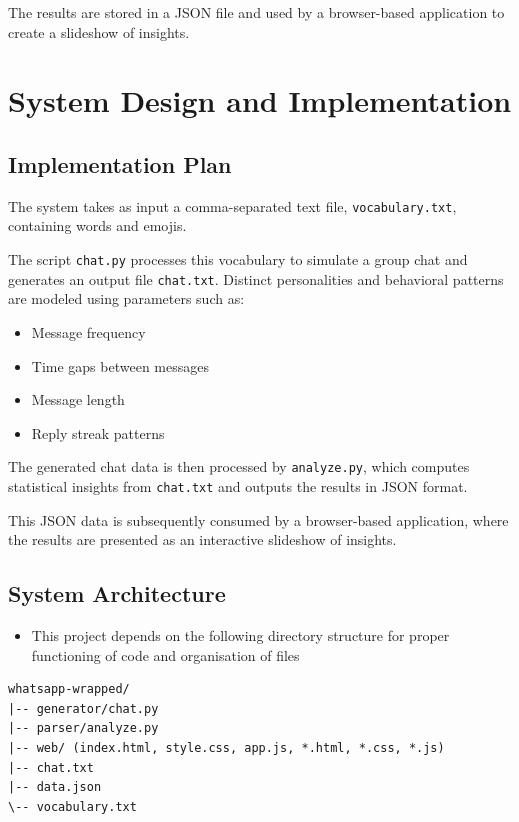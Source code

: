 \documentclass[11pt,a4paper]{article}
\begin{document}
The results are stored in a JSON\cite{json} file and used by a browser-based application to create a slideshow of insights.

\newpage
\section{System Design and Implementation}

\subsection{Implementation Plan}
The system takes as input a comma-separated text file, \texttt{vocabulary.txt}, containing words and emojis.

The script \texttt{chat.py} processes this vocabulary to simulate a group chat and generates an output file \texttt{chat.txt}. Distinct personalities and behavioral patterns are modeled using parameters such as:
\begin{itemize}
    \item Message frequency
    \item Time gaps between messages
    \item Message length
    \item Reply streak patterns
\end{itemize}

The generated chat data is then processed by \texttt{analyze.py}, which computes statistical insights from \texttt{chat.txt} and outputs the results in JSON\cite{json} format.

This JSON data is subsequently consumed by a browser-based application, where the results are presented as an interactive slideshow of insights.

\subsection{System Architecture}

\begin{itemize}
\item This project depends on the following directory structure for proper functioning of code and organisation of files
\end{itemize}

\begin{lstlisting}[breaklines=true]
whatsapp-wrapped/
|-- generator/chat.py
|-- parser/analyze.py
|-- web/ (index.html, style.css, app.js, *.html, *.css, *.js)
|-- chat.txt
|-- data.json
\-- vocabulary.txt
\end{lstlisting}
\begin{center}\end{center}
\end{document}
